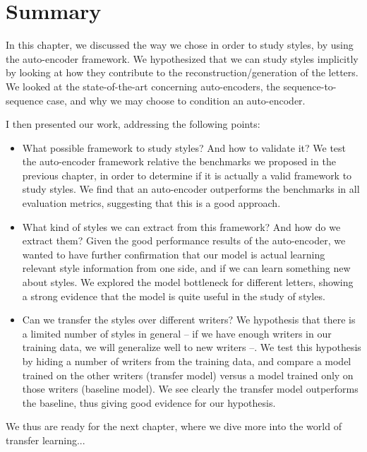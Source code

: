   \section{Summary}

    \par In this chapter, we discussed the way we chose in order to study styles, by using the auto-encoder framework. We hypothesized that we can study styles implicitly by looking at how they contribute to the reconstruction/generation of the letters. We looked at the state-of-the-art concerning auto-encoders, the sequence-to-sequence case, and why we may choose to condition an auto-encoder.

    \par I then presented our work, addressing the following points:
    \begin{itemize}
      \item What possible framework to study styles? And how to validate it? We test the auto-encoder framework relative the benchmarks we proposed in the previous chapter, in order to determine if it is actually a valid framework to study styles. We find that an auto-encoder outperforms the benchmarks in all evaluation metrics, suggesting that this is a good approach.
      \item What kind of styles we can extract from this framework? And how do we extract them? Given the good performance results of the auto-encoder, we wanted to have further confirmation that our model is actual learning relevant style information from one side, and if we can learn something new about styles. We explored the model bottleneck for different letters, showing a strong evidence that the model is quite useful in the study of styles.
      \item Can we transfer the styles over different writers? We hypothesis that there is a limited number of styles in general -- if we have enough writers in our training data, we will generalize well to new writers --. We test this hypothesis by hiding a number of writers from the training data, and compare a model trained on the other writers (transfer model) versus a model trained only on those writers (baseline model). We see clearly the transfer model outperforms the baseline, thus giving good evidence for our hypothesis.
    \end{itemize}

    We thus are ready for the next chapter, where we dive more into the world of transfer learning...
